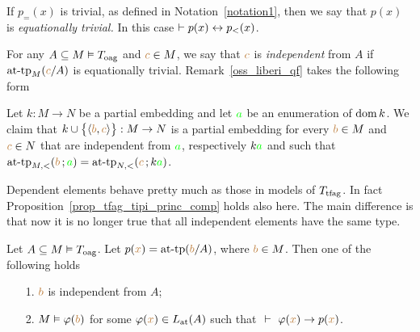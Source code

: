 If $p_{=}(x)$ is trivial, as defined in Notation~\ref{notation1}, then we say that $p(x)$ is \emph{equationally trivial.}
In this case $\proves p(x)\iff p_<(x)$.

For any $A\subseteq M\models T_{\rm oag}$ and ${\mr c}\in M$, we say that ${\mr c}$ is \emph{independent\/} from $A$ if $\attp_M({\mr c}/A)$ is equationally trivial.
Remark~\ref{oss_liberi_qf} takes the following form

\begin{remark}\label{rk_oag_ind}
  Let $k:M\to N$ be a partial embedding and let ${\gr a}$ be an enumeration of $\dom k$.
  We claim that $k\cup\big\{\<{\mr b},{\mr c}\>\big\}:M\to N$ is a partial embedding for every ${\mr b}\in M$ and ${\mr c}\in N$ that are independent from ${\gr a}$, respectively $k{\gr a}$ and such that $\attp_{M,<}({\mr b}\,;{\gr a})=\attp_{N,<}({\mr c}\,;k{\gr a})$.\QED 
\end{remark}

Dependent elements behave pretty much as those in models of $T_{\rm tfag}$.
%
In fact Proposition~\ref{prop_tfag_tipi_princ_comp} holds also here. 
The main difference is that now it is no longer true that all independent elements have the same type.

\begin{proposition}\label{prop_oag_tipi_princ_comp}
  Let $A\subseteq M\models T_{\rm oag}$.
  Let $p({\mr x})=\attp({\mr b}/A)$, where ${\mr b} \in M$.
  Then one of the following holds   
  \begin{itemize}
  \item[1.] ${\mr b}$ is independent from $A$;
  \item[2.] $M\models\phi({\mr b})$ for some $\phi({\mr x})\in L_{\rm at}(A)$ such that $\ \proves\ \phi({\mr x})\imp p({\mr x})$.
  \end{itemize}
\end{proposition}

